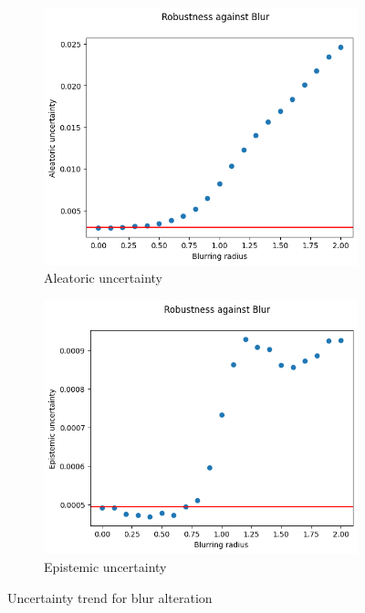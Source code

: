 \begin{figure}[h]
	\centering
	\begin{subfigure}{.5\textwidth}
		\centering
		\includegraphics[width=0.9\linewidth]{ImageFiles/EvalBNN/BL/aleatoric}
		\caption{Aleatoric uncertainty}
		\label{fig:bl_aleatoric}
	\end{subfigure}%
	\begin{subfigure}{.5\textwidth}
		\centering
		\includegraphics[width=0.9\linewidth]{ImageFiles/EvalBNN/BL/epistemic}
		\caption{Epistemic uncertainty}
		\label{fig:bl_epistemic}
	\end{subfigure}
	\caption{Uncertainty trend for blur alteration}
	\label{fig:bl_uncertainty}
\end{figure}

